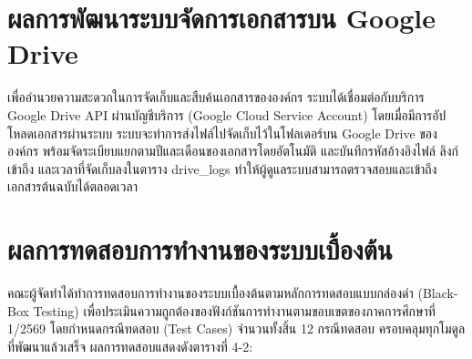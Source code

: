\section{ผลการพัฒนาระบบจัดการเอกสารบน Google Drive}
\hspace*{1.3em}
เพื่ออำนวยความสะดวกในการจัดเก็บและสืบค้นเอกสารขององค์กร ระบบได้เชื่อมต่อกับบริการ Google Drive API ผ่านบัญชีบริการ (Google Cloud Service Account) โดยเมื่อมีการอัปโหลดเอกสารผ่านระบบ ระบบจะทำการส่งไฟล์ไปจัดเก็บไว้ในโฟลเดอร์บน Google Drive ขององค์กร พร้อมจัดระเบียบแยกตามปีและเดือนของเอกสารโดยอัตโนมัติ และบันทึกรหัสอ้างอิงไฟล์ ลิงก์เข้าถึง และเวลาที่จัดเก็บลงในตาราง drive\_logs ทำให้ผู้ดูแลระบบสามารถตรวจสอบและเข้าถึงเอกสารต้นฉบับได้ตลอดเวลา

\section{ผลการทดสอบการทำงานของระบบเบื้องต้น}
\hspace*{1.3em}
คณะผู้จัดทำได้ทำการทดสอบการทำงานของระบบเบื้องต้นตามหลักการทดสอบแบบกล่องดำ (Black-Box Testing) เพื่อประเมินความถูกต้องของฟังก์ชันการทำงานตามขอบเขตของภาคการศึกษาที่ 1/2569 โดยกำหนดกรณีทดสอบ (Test Cases) จำนวนทั้งสิ้น 12 กรณีทดสอบ ครอบคลุมทุกโมดูลที่พัฒนาแล้วเสร็จ ผลการทดสอบแสดงดังตารางที่ 4-2:

